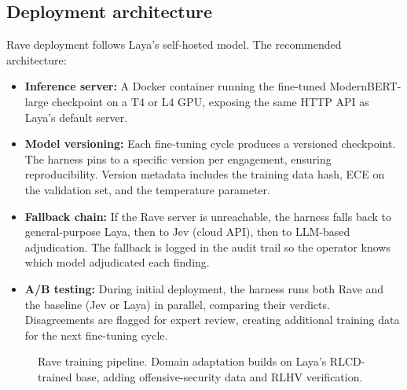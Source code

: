 \documentclass[conference]{IEEEtran}
\begin{document}
\subsection{Deployment architecture}

Rave deployment follows Laya's self-hosted model. The recommended architecture:

\begin{itemize}[leftmargin=*]
\item \textbf{Inference server:} A Docker container running the fine-tuned ModernBERT-large checkpoint on a T4 or L4 GPU, exposing the same HTTP API as Laya's default server.
\item \textbf{Model versioning:} Each fine-tuning cycle produces a versioned checkpoint. The harness pins to a specific version per engagement, ensuring reproducibility. Version metadata includes the training data hash, ECE on the validation set, and the temperature parameter.
\item \textbf{Fallback chain:} If the Rave server is unreachable, the harness falls back to general-purpose Laya, then to Jev (cloud API), then to LLM-based adjudication. The fallback is logged in the audit trail so the operator knows which model adjudicated each finding.
\item \textbf{A/B testing:} During initial deployment, the harness runs both Rave and the baseline (Jev or Laya) in parallel, comparing their verdicts. Disagreements are flagged for expert review, creating additional training data for the next fine-tuning cycle.
\end{itemize}

\begin{figure}[t]
\centering
{}
\caption{Rave training pipeline. Domain adaptation builds on Laya's RLCD-trained base, adding offensive-security data and RLHV verification.}
\label{fig:offensive}
\end{figure}
\end{document}

